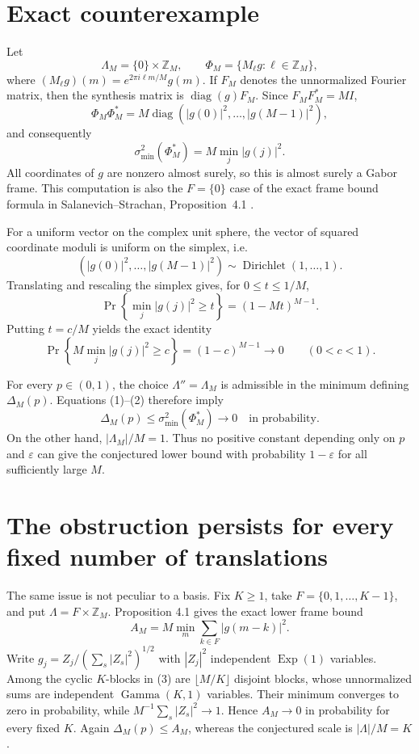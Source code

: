 \documentclass[11pt]{article}
\begin{document}
\section*{Exact counterexample}

Let
\[
 \Lambda_M=\{0\}\times\mathbb Z_M,
 \qquad
 \Phi_M=\{M_\ell g:\ell\in\mathbb Z_M\},
\]
where $(M_\ell g)(m)=e^{2\pi i\ell m/M}g(m)$.  If $F_M$ denotes the
unnormalized Fourier matrix, then the synthesis matrix is
$\operatorname{diag}(g)F_M$.  Since $F_MF_M^*=MI$,
\[
 \Phi_M\Phi_M^*=M\operatorname{diag}(|g(0)|^2,\ldots,|g(M-1)|^2),
\]
and consequently
\[
 \sigma_{\min}^2(\Phi_M^*)=M\min_j|g(j)|^2.                 \tag{1}
\]
All coordinates of $g$ are nonzero almost surely, so this is almost surely a
Gabor frame.  This computation is also the $F=\{0\}$ case of the exact frame
bound formula in Salanevich--Strachan, Proposition~4.1
\cite[Proposition~4.1]{bounds}.

For a uniform vector on the complex unit sphere, the vector of squared
coordinate moduli is uniform on the simplex, i.e.
\[
 (|g(0)|^2,\ldots,|g(M-1)|^2)\sim\operatorname{Dirichlet}(1,\ldots,1).
\]
Translating and rescaling the simplex gives, for $0\leq t\leq1/M$,
\[
 \Pr\!\left\{\min_j|g(j)|^2\geq t\right\}=(1-Mt)^{M-1}.
\]
Putting $t=c/M$ yields the exact identity
\[
 \Pr\!\left\{M\min_j|g(j)|^2\geq c\right\}=(1-c)^{M-1}\longrightarrow0
 \qquad(0<c<1).                                            \tag{2}
\]

For every $p\in(0,1)$, the choice $\Lambda''=\Lambda_M$ is admissible in the
minimum defining $\Delta_M(p)$.  Equations (1)--(2) therefore imply
\[
 \Delta_M(p)\leq\sigma_{\min}^2(\Phi_M^*)\longrightarrow0
 \quad\text{in probability}.
\]
On the other hand, $|\Lambda_M|/M=1$.  Thus no positive constant depending
only on $p$ and $\varepsilon$ can give the conjectured lower bound with
probability $1-\varepsilon$ for all sufficiently large $M$.

\section*{The obstruction persists for every fixed number of translations}

The same issue is not peculiar to a basis.  Fix $K\geq1$, take
$F=\{0,1,\ldots,K-1\}$, and put $\Lambda=F\times\mathbb Z_M$.  Proposition
4.1 gives the exact lower frame bound
\[
 A_M=M\min_m\sum_{k\in F}|g(m-k)|^2.                       \tag{3}
\]
Write $g_j=Z_j/(\sum_s|Z_s|^2)^{1/2}$ with $|Z_j|^2$ independent
$\operatorname{Exp}(1)$ variables.  Among the cyclic $K$-blocks in (3) are
$\lfloor M/K\rfloor$ disjoint blocks, whose unnormalized sums are independent
$\operatorname{Gamma}(K,1)$ variables.  Their minimum converges to zero in
probability, while $M^{-1}\sum_s|Z_s|^2\to1$.  Hence $A_M\to0$ in probability
for every fixed $K$.  Again $\Delta_M(p)\leq A_M$, whereas the conjectured
scale is $|\Lambda|/M=K$.
\end{document}
